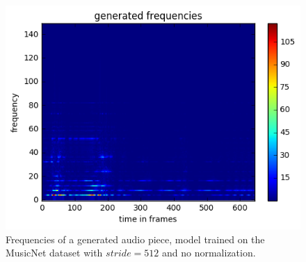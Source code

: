 \documentclass[10pt,conference,compsocconf]{IEEEtran}
\begin{document}
\begin{figure}[tbp]
  \centering
  \includegraphics[width=\columnwidth]{figures/generated_frequencies_20s_2.png}
  \caption{Frequencies of a generated audio piece, model trained on the MusicNet dataset with $stride=512$ and no normalization.}
  \label{fig:generated_frequencies}
\end{figure}
\end{document}
